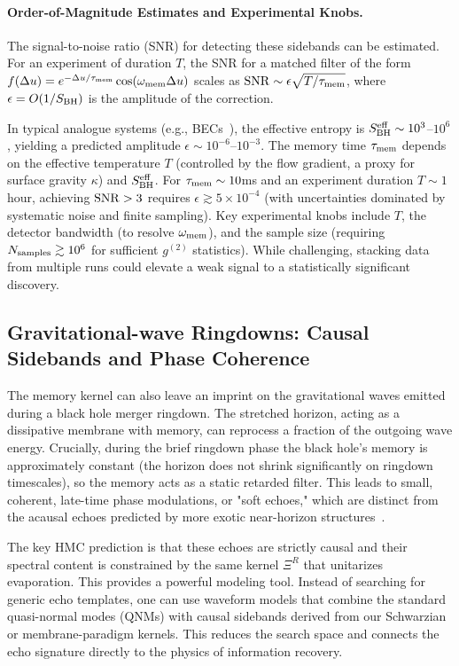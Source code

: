\documentclass[a4paper,11pt]{article}
\newcommand{\eg}{e.g.\xspace}
\newcommand{\HMC}{\textsc{HMC}\xspace}
\theoremstyle{plain}
\theoremstyle{definition}
\theoremstyle{remark}
\begin{document}
\paragraph{Order-of-Magnitude Estimates and Experimental Knobs.}
The signal-to-noise ratio (SNR) for detecting these sidebands can be estimated. For an experiment of duration $T$, the SNR for a matched filter of the form $f(\Delta u) = e^{-\Delta u/\tau_{\rm mem}}\cos(\omega_{\rm mem}\Delta u)$ scales as ${\rm SNR}\sim \epsilon\sqrt{T/\tau_{\rm mem}}$, where $\epsilon=O(1/S_{\rm BH})$ is the amplitude of the correction.

In typical analogue systems (\eg, BECs~\cite{Steinhauer:2016}), the effective entropy is $S_{\rm BH}^{\rm eff} \sim 10^3$--$10^6$, yielding a predicted amplitude $\epsilon \sim 10^{-6}$--$10^{-3}$. The memory time $\tau_{\rm mem}$ depends on the effective temperature $T$ (controlled by the flow gradient, a proxy for surface gravity $\kappa$) and $S_{\rm BH}^{\rm eff}$. For $\tau_{\rm mem} \sim 10$ms and an experiment duration $T \sim 1$ hour, achieving ${\rm SNR} > 3$ requires $\epsilon \gtrsim 5\times 10^{-4}$ (with uncertainties dominated by systematic noise and finite sampling). Key experimental knobs include $T$, the detector bandwidth (to resolve $\omega_{\rm mem}$), and the sample size (requiring $N_{\rm samples} \gtrsim 10^6$ for sufficient $g^{(2)}$ statistics). While challenging, stacking data from multiple runs could elevate a weak signal to a statistically significant discovery.

\subsection{Gravitational-wave Ringdowns: Causal Sidebands and Phase Coherence}
\label{subsec:gw_ringdowns}
The memory kernel can also leave an imprint on the gravitational waves emitted during a black hole merger ringdown. The stretched horizon, acting as a dissipative membrane with memory, can reprocess a fraction of the outgoing wave energy. Crucially, during the brief ringdown phase the black hole's memory is approximately constant (the horizon does not shrink significantly on ringdown timescales), so the memory acts as a static retarded filter. This leads to small, coherent, late-time phase modulations, or "soft echoes," which are distinct from the acausal echoes predicted by more exotic near-horizon structures~\cite{Cardoso:2016, Abedi:2017}.

The key \HMC{} prediction is that these echoes are strictly causal and their spectral content is constrained by the same kernel $\Xi^R$ that unitarizes evaporation. This provides a powerful modeling tool. Instead of searching for generic echo templates, one can use waveform models that combine the standard quasi-normal modes (QNMs) with causal sidebands derived from our Schwarzian or membrane-paradigm kernels. This reduces the search space and connects the echo signature directly to the physics of information recovery. 
\end{document}

